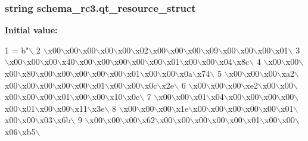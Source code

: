 \subsubsection[{qt\+\_\+resource\+\_\+struct}]{\setlength{\rightskip}{0pt plus 5cm}string schema\+\_\+rc3.\+qt\+\_\+resource\+\_\+struct}\label{namespaceschema__rc3_ad1348b5866838d65befdbecbede3d38c}
{\bfseries Initial value\+:}
\begin{DoxyCode}
1 = b\textcolor{stringliteral}{"\(\backslash\)}
2 \textcolor{stringliteral}{\(\backslash\)x00\(\backslash\)x00\(\backslash\)x00\(\backslash\)x00\(\backslash\)x00\(\backslash\)x02\(\backslash\)x00\(\backslash\)x00\(\backslash\)x00\(\backslash\)x09\(\backslash\)x00\(\backslash\)x00\(\backslash\)x00\(\backslash\)x01\(\backslash\)}
3 \textcolor{stringliteral}{\(\backslash\)x00\(\backslash\)x00\(\backslash\)x00\(\backslash\)x40\(\backslash\)x00\(\backslash\)x00\(\backslash\)x00\(\backslash\)x00\(\backslash\)x00\(\backslash\)x01\(\backslash\)x00\(\backslash\)x00\(\backslash\)x04\(\backslash\)x8c\(\backslash\)}
4 \textcolor{stringliteral}{\(\backslash\)x00\(\backslash\)x00\(\backslash\)x00\(\backslash\)x80\(\backslash\)x00\(\backslash\)x00\(\backslash\)x00\(\backslash\)x00\(\backslash\)x00\(\backslash\)x01\(\backslash\)x00\(\backslash\)x00\(\backslash\)x0a\(\backslash\)x74\(\backslash\)}
5 \textcolor{stringliteral}{\(\backslash\)x00\(\backslash\)x00\(\backslash\)x00\(\backslash\)xa2\(\backslash\)x00\(\backslash\)x00\(\backslash\)x00\(\backslash\)x00\(\backslash\)x00\(\backslash\)x01\(\backslash\)x00\(\backslash\)x00\(\backslash\)x0c\(\backslash\)x2e\(\backslash\)}
6 \textcolor{stringliteral}{\(\backslash\)x00\(\backslash\)x00\(\backslash\)x00\(\backslash\)xe2\(\backslash\)x00\(\backslash\)x00\(\backslash\)x00\(\backslash\)x00\(\backslash\)x00\(\backslash\)x01\(\backslash\)x00\(\backslash\)x00\(\backslash\)x10\(\backslash\)x0c\(\backslash\)}
7 \textcolor{stringliteral}{\(\backslash\)x00\(\backslash\)x00\(\backslash\)x01\(\backslash\)x04\(\backslash\)x00\(\backslash\)x00\(\backslash\)x00\(\backslash\)x00\(\backslash\)x00\(\backslash\)x01\(\backslash\)x00\(\backslash\)x00\(\backslash\)x11\(\backslash\)x3e\(\backslash\)}
8 \textcolor{stringliteral}{\(\backslash\)x00\(\backslash\)x00\(\backslash\)x00\(\backslash\)x1e\(\backslash\)x00\(\backslash\)x00\(\backslash\)x00\(\backslash\)x00\(\backslash\)x00\(\backslash\)x01\(\backslash\)x00\(\backslash\)x00\(\backslash\)x03\(\backslash\)x6b\(\backslash\)}
9 \textcolor{stringliteral}{\(\backslash\)x00\(\backslash\)x00\(\backslash\)x00\(\backslash\)x62\(\backslash\)x00\(\backslash\)x00\(\backslash\)x00\(\backslash\)x00\(\backslash\)x00\(\backslash\)x01\(\backslash\)x00\(\backslash\)x00\(\backslash\)x06\(\backslash\)xb5\(\backslash\)}

\end{DoxyCode}

